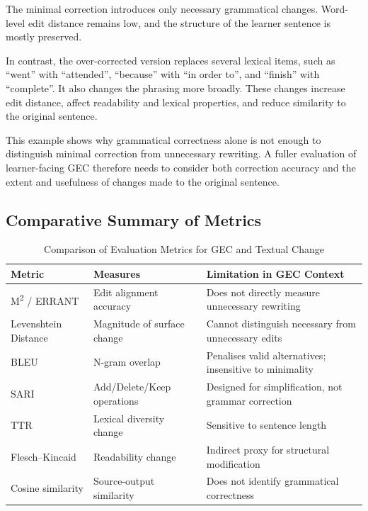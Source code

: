The minimal correction introduces only necessary grammatical changes. Word-level edit distance remains low, and the structure of the learner sentence is mostly preserved.

In contrast, the over-corrected version replaces several lexical items, such as ``went'' with ``attended'', ``because'' with ``in order to'', and ``finish'' with ``complete''. It also changes the phrasing more broadly. These changes increase edit distance, affect readability and lexical properties, and reduce similarity to the original sentence.

This example shows why grammatical correctness alone is not enough to distinguish minimal correction from unnecessary rewriting. A fuller evaluation of learner-facing GEC therefore needs to consider both correction accuracy and the extent and usefulness of changes made to the original sentence.

\subsection{Comparative Summary of Metrics}

\begin{table}[h]
\centering
\caption{Comparison of Evaluation Metrics for GEC and Textual Change}
\label{tab:metric_comparison}
\begin{tabular}{|p{3cm}|p{5cm}|p{6cm}|}
\hline
\textbf{Metric} & \textbf{Measures} & \textbf{Limitation in GEC Context} \\
\hline
M\textsuperscript{2} / ERRANT & Edit alignment accuracy & Does not directly measure unnecessary rewriting \\
\hline
Levenshtein Distance & Magnitude of surface change & Cannot distinguish necessary from unnecessary edits \\
\hline
BLEU & N-gram overlap & Penalises valid alternatives; insensitive to minimality \\
\hline
SARI & Add/Delete/Keep operations & Designed for simplification, not grammar correction \\
\hline
TTR & Lexical diversity change & Sensitive to sentence length \\
\hline
Flesch--Kincaid & Readability change & Indirect proxy for structural modification \\
\hline
Cosine similarity & Source-output similarity & Does not identify grammatical correctness \\
\hline
\end{tabular}
\end{table}

